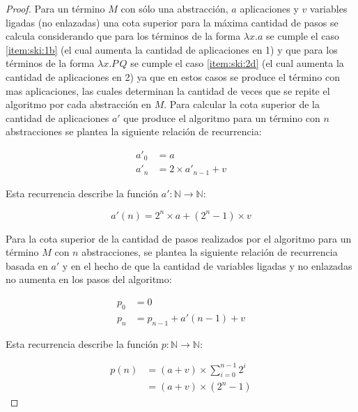 \begin{proof}
  Para un término \( M \) con sólo una abstracción, \( \mathit{a} \) aplicaciones y \( \mathit{v} \) variables ligadas (no enlazadas) una cota superior para la máxima cantidad de pasos se calcula considerando que para los términos de la forma \( λx.a \) se cumple el caso \ref{item:ski:1b} (el cual aumenta la cantidad de aplicaciones en 1) y que para los términos de la forma \( λx.P\, Q \) se cumple el caso \ref{item:ski:2d} (el cual aumenta la cantidad de aplicaciones en 2) ya que en estos casos se produce el término con mas aplicaciones, las cuales determinan la cantidad de veces que se repite el algoritmo por cada abstracción en \( M \). Para calcular la cota superior de la cantidad de aplicaciones \( a' \) que produce el algoritmo para un término con \( n \) abstracciones se plantea la siguiente relación de recurrencia:

  \begin{align*}
    \mathit{a}'_{0} &= \mathit{a} \\
    \mathit{a}'_{n} &= 2 \times \mathit{a}'_{n-1} + \mathit{v}
  \end{align*}

  Esta recurrencia describe la función \( \mathit{a}' \colon \mathbb{N} \to \mathbb{N} \):

  \[ \mathit{a}'(n) = 2^{n} \times \mathit{a} + (2^{n}-1) \times \mathit{v} \]

  Para la cota superior de la cantidad de pasos realizados por el algoritmo para un término \( M \) con \( n \) abstracciones, se plantea la siguiente relación de recurrencia basada en \( \mathit{a}' \) y en el hecho de que la cantidad de variables ligadas y no enlazadas no aumenta en los pasos del algoritmo:

  \begin{align*}
    \mathit{p}_{0} &= 0 \\
    \mathit{p}_{n} &= \mathit{p}_{n-1} + \mathit{a}'(n-1) + \mathit{v}
  \end{align*}

  Esta recurrencia describe la función \( \mathit{p} \colon \mathbb{N} \to \mathbb{N} \):

  \begin{align*}
    \mathit{p}(n) &= (\mathit{a} + \mathit{v}) \times \sum_{i=0}^{n-1} 2^{i} \\
                  &= (\mathit{a} + \mathit{v}) \times (2^{n}-1)
  \end{align*}
  
\end{proof}

